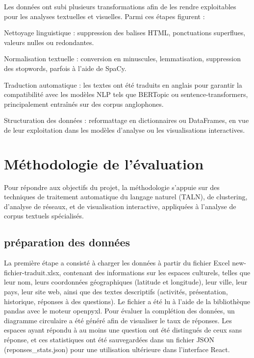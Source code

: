 \documentclass[mstat,12pt]{unswthesis}
\begin{document}
Les données ont subi plusieurs transformations afin de les rendre exploitables pour les analyses textuelles et visuelles. Parmi ces étapes figurent :

Nettoyage linguistique : suppression des balises HTML, ponctuations superflues, valeurs nulles ou redondantes.

Normalisation textuelle : conversion en minuscules, lemmatisation, suppression des stopwords, parfois à l’aide de SpaCy.

Traduction automatique : les textes ont été traduits en anglais pour garantir la compatibilité avec les modèles NLP tels que BERTopic ou sentence-transformers, principalement entraînés sur des corpus anglophones.

Structuration des données : reformattage en dictionnaires ou DataFrames, en vue de leur exploitation dans les modèles d’analyse ou les visualisations interactives.


\hypertarget{muxe9thodologie-de-luxe9valuation}{%
\section{Méthodologie de l'évaluation}\label{muxe9thodologie-de-luxe9valuation}}

Pour répondre aux objectifs du projet, la méthodologie s'appuie sur des techniques de traitement automatique du langage naturel (TALN), de clustering, d'analyse de réseaux, et de visualisation interactive, appliquées à l'analyse de corpus textuels spécialisés.

\subsection{préparation des données}

La première étape a consisté à charger les données à partir du fichier Excel new-fichier-traduit.xlsx, contenant des informations sur les espaces culturels, telles que leur nom, leurs coordonnées géographiques (latitude et longitude), leur ville, leur pays, leur site web, ainsi que des textes descriptifs (activités, présentation, historique, réponses à des questions). Le fichier a été lu à l'aide de la bibliothèque pandas avec le moteur openpyxl.
Pour évaluer la complétion des données, un diagramme circulaire a été généré afin de visualiser le taux de réponses. Les espaces ayant répondu à au moins une question ont été distingués de ceux sans réponse, et ces statistiques ont été sauvegardées dans un fichier JSON (reponses\_stats.json) pour une utilisation ultérieure dans l'interface React.
\end{document}
